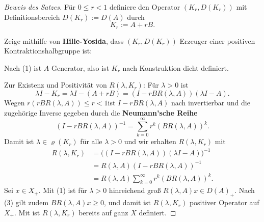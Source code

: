 \begin{proof}[Beweis des Satzes]
\par
Für $0\leq r < 1$ definiere den Operator $(K_r, D(K_r))$ mit Definitionsbereich $D(K_r):=D(A)$ durch
\begin{equation*}
K_r:= A+rB.
\end{equation*}

\par
Zeige mithilfe von \textbf{Hille-Yosida}, dass $(K_r, D(K_r))$ Erzeuger einer positiven Kontraktionshalbgruppe ist:
\par 
Nach (1) ist $A$ Generator, also ist $K_r$ nach Konstruktion dicht definiert. 

\par 
Zur Existenz und Positivität von $R(\lambda, K_r)$: Für $\lambda>0$ ist
\begin{equation*}
\lambda I - K_r = \lambda I- (A+rB)=(I-rBR(\lambda, A))(\lambda I-A).
\end{equation*}
Wegen $r(rBR(\lambda, A))\leq r< 1$ist $I-rBR(\lambda, A)$ nach invertierbar und die zugehörige Inverse gegeben durch die \textbf{Neumann'sche Reihe} 
\begin{equation*}
(I-rBR(\lambda, A))^{-1}=\sum_{k=0}^\infty r^k (BR(\lambda, A))^k.
\end{equation*}
Damit ist $\lambda\in\varrho(K_r)$ für alle $\lambda>0$ und wir erhalten $R(\lambda, K_r)$ mit
\begin{align*}
R(\lambda, K_r)
&=\big((I-rBR(\lambda, A))(\lambda I-A)\big)^{-1}\\
&=R(\lambda, A)(I-rBR(\lambda, A))^{-1}\\
&=R(\lambda, A)\sum_{k=0}^\infty r^k (BR(\lambda, A))^k.
\end{align*}
Sei $x\in X_+$. Mit (1) ist für $\lambda>0$ hinreichend groß  $R(\lambda, A)x\in D(A)_+$. Nach (3) gilt zudem $BR(\lambda,A)x\geq0$, und damit ist $R(\lambda, K_r)$ positiver Operator auf $X_+$. Mit  ist $R(\lambda, K_r)$ bereits auf ganz $X$ definiert.


\end{proof}
